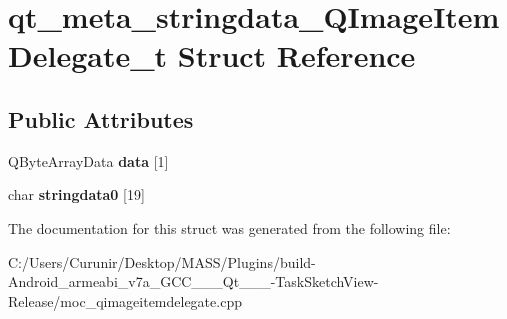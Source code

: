 \hypertarget{structqt__meta__stringdata___q_image_item_delegate__t}{}\section{qt\+\_\+meta\+\_\+stringdata\+\_\+\+Q\+Image\+Item\+Delegate\+\_\+t Struct Reference}
\label{structqt__meta__stringdata___q_image_item_delegate__t}
\subsection*{Public Attributes}
\begin{DoxyCompactItemize}
\item 
\mbox{\label{structqt__meta__stringdata___q_image_item_delegate__t_a742dfb00878456e01484f4e681b91eeb}} 
Q\+Byte\+Array\+Data {\bfseries data} \mbox{[}1\mbox{]}
\item 
\mbox{\label{structqt__meta__stringdata___q_image_item_delegate__t_a7b39ce9c1bfdb5a835a2ba9fd587a975}} 
char {\bfseries stringdata0} \mbox{[}19\mbox{]}
\end{DoxyCompactItemize}


The documentation for this struct was generated from the following file\+:\begin{DoxyCompactItemize}
\item 
C\+:/\+Users/\+Curunir/\+Desktop/\+M\+A\+S\+S/\+Plugins/build-\/\+Android\+\_\+armeabi\+\_\+v7a\+\_\+\+G\+C\+C\+\_\+\_\+\_\+\+Qt\+\_\+\_\+\_-\/\+Task\+Sketch\+View-\/\+Release/moc\+\_\+qimageitemdelegate.\+cpp\end{DoxyCompactItemize}

